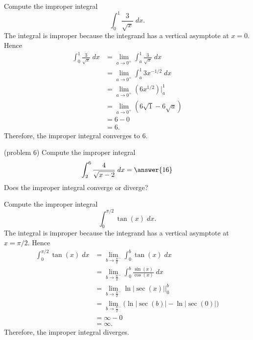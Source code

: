 \documentclass{ximera}
\begin{document}
\begin{example}[example 6]
Compute the improper integral
\[
\int_0^1 \frac{3}{\sqrt x} \; dx.
\]
The integral is improper because the integrand has a vertical asymptote at $x = 0$. Hence
\begin{align*}
\int_0^1 \frac{3}{\sqrt x} \; dx &= \lim_{a \to 0^+} \int_a^1 \frac{3}{\sqrt x} \; dx\\
                                 &= \lim_{a \to 0^+} \int_a^1 3x^{-1/2} \; dx\\
                                 &= \lim_{a \to 0^+} \left( 6x^{1/2}  \right) \bigg|_a^1\\
                                 &= \lim_{a \to 0^+} \left( 6\sqrt{1} - 6\sqrt{a}  \right) \\
                                 &=  6 - 0   \\
                                 &= 6.
\end{align*}
 Therefore, the improper integral converges to 6.
 \end{example}
 
\begin{problem}(problem 6)
Compute the improper integral
\[
\int_2^6 \frac{4}{\sqrt{x-2}} \; dx = \answer{16}
\]
Does the improper integral converge or diverge?
\begin{multipleChoice}
\end{multipleChoice}
\end{problem}


\begin{example}[example 7]
Compute the improper integral
\[
\int_0^{\pi/2} \tan(x) \; dx.
\]
The integral is improper because the integrand has a vertical asymptote at $x = \pi/2$. Hence
\begin{align*}
\int_0^{\pi/2} \tan(x) \; dx &= \lim_{b \to \frac{\pi}{2}^-} \int_0^b \tan(x) \; dx\\
                                 &= \lim_{b \to \frac{\pi}{2}^-} \int_0^b \frac{\sin(x)}{\cos(x)} \; dx\\
                                 &= \lim_{b \to \frac{\pi}{2}^-}  \ln|\sec(x)|   \bigg|_0^b\\
                                 &= \lim_{b \to \frac{\pi}{2}^-} \big( \ln|\sec(b)| - \ln|\sec(0)|  \big) \\
                                 &=  \infty - 0  \\
                                 &= \infty.
\end{align*}
 Therefore, the improper integral diverges.
 \end{example}
 
\end{document}
